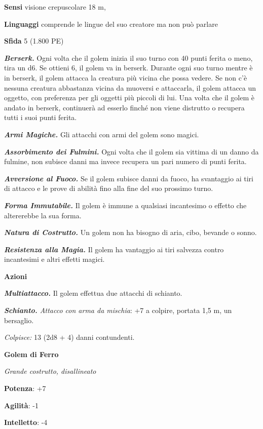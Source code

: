 \begin{multicols}{2}
\textbf{Sensi} visione crepuscolare 18 m, 

\textbf{Linguaggi} comprende le lingue del suo creatore ma non può
parlare

\textbf{Sfida} 5 (1.800 PE)

\emph{\textbf{Berserk.}} Ogni volta che il golem inizia il suo turno con
40 punti ferita o meno, tira un d6. Se ottieni 6, il golem va in
berserk. Durante ogni suo turno mentre è in berserk, il golem attacca la
creatura più vicina che possa vedere. Se non c'è nessuna creatura
abbastanza vicina da muoversi e attaccarla, il golem attacca un oggetto,
con preferenza per gli oggetti più piccoli di lui. Una volta che il
golem è andato in berserk, continuerà ad esserlo finché non viene
distrutto o recupera tutti i suoi punti ferita.

\emph{\textbf{Armi Magiche.}} Gli attacchi con armi del golem sono
magici.

\emph{\textbf{Assorbimento dei Fulmini.}} Ogni volta che il golem sia
vittima di un danno da fulmine, non subisce danni ma invece recupera un
pari numero di punti ferita.

\emph{\textbf{Avversione al Fuoco.}} Se il golem subisce danni da fuoco,
ha svantaggio ai tiri di attacco e le prove di abilità fino alla fine
del suo prossimo turno.

\emph{\textbf{Forma Immutabile.}} Il golem è immune a qualsiasi
incantesimo o effetto che altererebbe la sua forma.

\emph{\textbf{Natura di Costrutto.}} Un golem non ha bisogno di aria,
cibo, bevande o sonno.

\emph{\textbf{Resistenza alla Magia.}} Il golem ha vantaggio ai tiri
salvezza contro incantesimi e altri effetti magici.

\textbf{Azioni}

\emph{\textbf{Multiattacco.}} Il golem effettua due attacchi di
schianto.

\emph{\textbf{Schianto.} Attacco con arma da mischia}: +7 a colpire,
portata 1,5 m, un bersaglio.

\emph{Colpisce:} 13 (2d8 + 4) danni contundenti.



\textbf{Golem di Ferro}

\emph{Grande costrutto, disallineato}

\textbf{Potenza}: +7

\textbf{Agilità}: -1

\textbf{Intelletto}: -4


\end{multicols}
